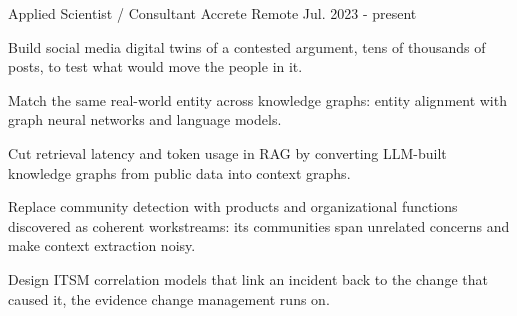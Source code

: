 

\begin{cventries}

  \cventry
    {Applied Scientist / Consultant} %
    {Accrete} %
    {Remote} %
    {Jul. 2023 - present} %
    {
      \begin{cvitems} %
        \item{Build social media digital twins of a contested argument, tens of thousands of posts, to test what would move the people in it.}
        \item{Match the same real-world entity across knowledge graphs: entity alignment with graph neural networks and language models.}
        \item{Cut retrieval latency and token usage in RAG by converting LLM-built knowledge graphs from public data into context graphs.}
        \item{Replace community detection with products and organizational functions discovered as coherent workstreams: its communities span unrelated concerns and make context extraction noisy.}
        \item{Design ITSM correlation models that link an incident back to the change that caused it, the evidence change management runs on.}
      \end{cvitems}
    }


\end{cventries}

